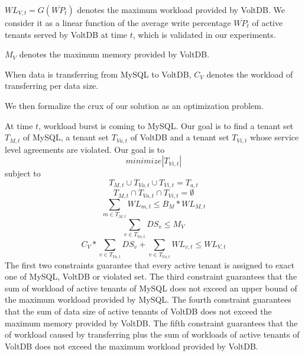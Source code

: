\documentclass{article}
\begin{document}
$WL_{V, t} = G(\overline{WP_t})$ denotes the maximum workload provided by VoltDB. We consider it as a linear function of the average write percentage $\overline{WP_t}$ of active tenants served by VoltDB at time $t$, which is validated in our experiments.

$M_V$ denotes the maximum memory provided by VoltDB.

When data is transferring from MySQL to VoltDB, $C_V$ denotes the workload of transferring per data size.

We then formalize the crux of our solution as an optimization problem.

At time $t$, workload burst is coming to MySQL. Our goal is to find a tenant set $T_{M, t}$ of MySQL, a tenant set $T_{Vo, t}$ of VoltDB and a tenant set $T_{Vi, t}$ whose service level agreements are violated. Our goal is to
\begin{equation}\label{objectivefunction}
minimize |T_{Vi ,t}|
\end{equation}
subject to
\begin{equation}\label{constraint1}
T_{M, t} \cup T_{Vo, t} \cup T_{Vi, t} = T_{a, t}
\end{equation}
\begin{equation}\label{constraint2}
T_{M, t} \cap T_{Vo, t} \cap T_{Vi, t} = \emptyset
\end{equation}
\begin{equation}\label{constraint3}
\sum_{m \in T_{M, t}}{WL_{m, t}} \leq B_M * WL_{M, t}
\end{equation}
\begin{equation}\label{constraint4}
\sum_{v \in T_{Vo, t}}{DS_v} \leq M_V
\end{equation}
\begin{equation}\label{constraint5}
C_V * \sum_{v \in T_{Vo, t}}{DS_v} + \sum_{v \in T_{Vo, t}}{WL_{v, t}} \leq WL_{V, t}
\end{equation}
The first two constraints guarantee that every active tenant is assigned to exact one of MySQL, VoltDB or violated set. The third constraint guarantees that the sum of workload of active tenants of MySQL does not exceed an upper bound of the maximum workload provided by MySQL. The fourth constraint guarantees that the sum of data size of active tenants of VoltDB does not exceed the maximum memory provided by VoltDB. The fifth constraint guarantees that the of workload caused by transferring plus the sum of workloads of active tenants of VoltDB does not exceed the maximum workload provided by VoltDB.
\end{document}
